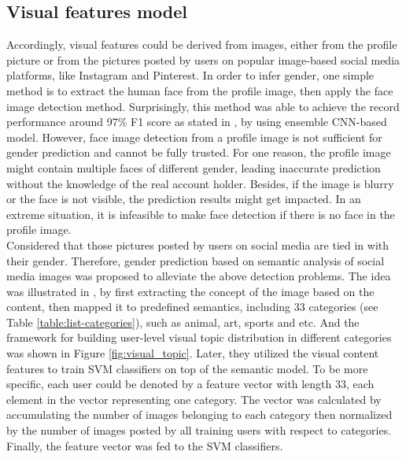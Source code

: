 \documentclass[runningheads]{llncs}
\begin{document}
	
	\subsection{Visual features model}
	
	Accordingly, visual features could be derived from images, either from the profile picture or from the pictures posted by users on popular image-based social media platforms, like Instagram and Pinterest. In order to infer gender, one simple method is to extract the human face from the profile image, then apply the face image detection method. Surprisingly, this method was able to achieve the record performance around 97\% F1 score as stated in \cite{antipov2016minimalistic}, by using ensemble CNN-based model. However, face image detection from a profile image is not sufficient for gender prediction and cannot be fully trusted. For one reason, the profile image might contain multiple faces of different gender, leading inaccurate prediction without the knowledge of the real account holder. Besides, if the image is blurry or the face is not visible, the prediction results might get impacted. In an extreme situation,  it is infeasible to make face detection if there is no face in the profile image. \\
	
	Considered that those pictures posted by users on social media are tied in with their gender. Therefore, gender prediction based on semantic analysis of social media images was proposed to alleviate the above detection problems. The idea was illustrated in \cite{you2014eyes}, by first extracting the concept of the image based on the content, then mapped it to predefined semantics, including 33 categories (see Table \ref{table:list-categories}), such as animal, art, sports and etc. And the framework for building user-level visual topic distribution in different categories was shown in Figure \ref{fig:visual_topic}. Later, they utilized the visual content features to train SVM classifiers on top of the semantic model. To be more specific, each user could be denoted by a feature vector with length 33, each element in the vector representing one category. The vector was calculated by accumulating the number of images belonging to each category then normalized by the number of images posted by all training users with respect to categories. Finally, the feature vector was fed to the SVM classifiers. \\
	
\end{document}
